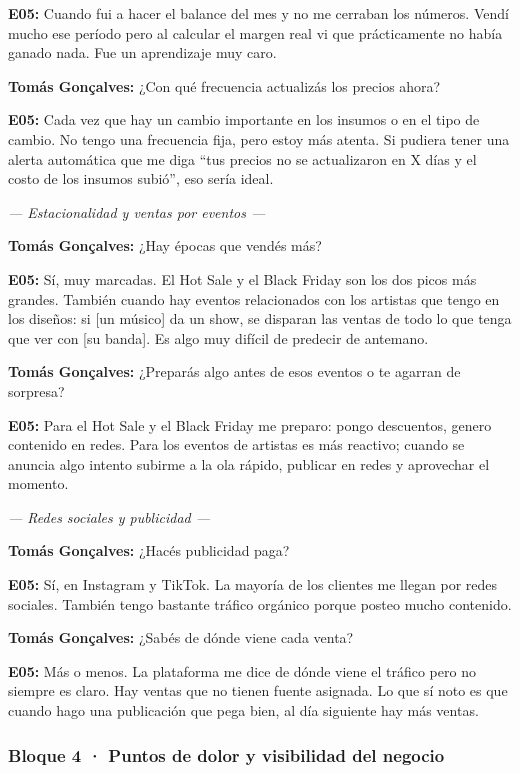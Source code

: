 \noindent\textbf{E05:} Cuando fui a hacer el balance del mes y no me cerraban los números. Vendí mucho ese período pero al calcular el margen real vi que prácticamente no había ganado nada. Fue un aprendizaje muy caro.

\noindent\textbf{Tomás Gonçalves:} ¿Con qué frecuencia actualizás los precios ahora?

\noindent\textbf{E05:} Cada vez que hay un cambio importante en los insumos o en el tipo de cambio. No tengo una frecuencia fija, pero estoy más atenta. Si pudiera tener una alerta automática que me diga ``tus precios no se actualizaron en X días y el costo de los insumos subió'', eso sería ideal.

\noindent\textit{--- Estacionalidad y ventas por eventos ---}

\noindent\textbf{Tomás Gonçalves:} ¿Hay épocas que vendés más?

\noindent\textbf{E05:} Sí, muy marcadas. El Hot Sale y el Black Friday son los dos picos más grandes. También cuando hay eventos relacionados con los artistas que tengo en los diseños: si [un músico] da un show, se disparan las ventas de todo lo que tenga que ver con [su banda]. Es algo muy difícil de predecir de antemano.

\noindent\textbf{Tomás Gonçalves:} ¿Preparás algo antes de esos eventos o te agarran de sorpresa?

\noindent\textbf{E05:} Para el Hot Sale y el Black Friday me preparo: pongo descuentos, genero contenido en redes. Para los eventos de artistas es más reactivo; cuando se anuncia algo intento subirme a la ola rápido, publicar en redes y aprovechar el momento.

\noindent\textit{--- Redes sociales y publicidad ---}

\noindent\textbf{Tomás Gonçalves:} ¿Hacés publicidad paga?

\noindent\textbf{E05:} Sí, en Instagram y TikTok. La mayoría de los clientes me llegan por redes sociales. También tengo bastante tráfico orgánico porque posteo mucho contenido.

\noindent\textbf{Tomás Gonçalves:} ¿Sabés de dónde viene cada venta?

\noindent\textbf{E05:} Más o menos. La plataforma me dice de dónde viene el tráfico pero no siempre es claro. Hay ventas que no tienen fuente asignada. Lo que sí noto es que cuando hago una publicación que pega bien, al día siguiente hay más ventas.

\subsubsection*{Bloque 4 · Puntos de dolor y visibilidad del negocio}

